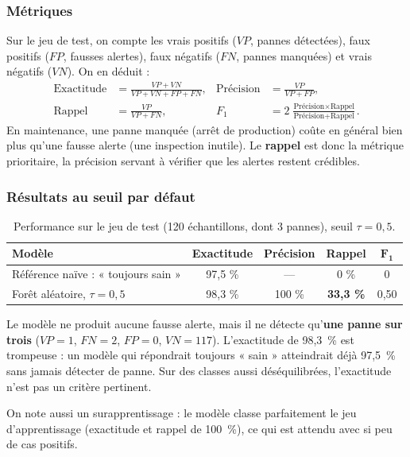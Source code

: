 \documentclass[11pt,a4paper]{article}
\newcommand{\pct}[1]{#1~\%}
\begin{document}
\subsubsection{Métriques}
Sur le jeu de test, on compte les vrais positifs ($VP$, pannes détectées), faux positifs ($FP$,
fausses alertes), faux négatifs ($FN$, pannes manquées) et vrais négatifs ($VN$). On en déduit :
\begin{align}
\text{Exactitude} &= \frac{VP + VN}{VP + VN + FP + FN}, &
\text{Précision} &= \frac{VP}{VP + FP}, \\[4pt]
\text{Rappel} &= \frac{VP}{VP + FN}, &
F_1 &= 2\,\frac{\text{Précision} \times \text{Rappel}}{\text{Précision} + \text{Rappel}} .
\end{align}
En maintenance, une panne manquée (arrêt de production) coûte en général bien plus qu'une fausse
alerte (une inspection inutile). Le \textbf{rappel} est donc la métrique prioritaire, la précision
servant à vérifier que les alertes restent crédibles.

\subsubsection{Résultats au seuil par défaut}
\begin{table}[ht]
\centering\small
\caption{Performance sur le jeu de test (120 échantillons, dont 3 pannes), seuil $\tau = 0{,}5$.}
\label{tab:metriques}
\begin{tabular}{@{}lcccc@{}}
\toprule
\textbf{Modèle} & \textbf{Exactitude} & \textbf{Précision} & \textbf{Rappel} & $\boldsymbol{F_1}$ \\
\midrule
Référence naïve : « toujours sain » & 97,5 \% & — & 0 \% & 0 \\
Forêt aléatoire, $\tau = 0{,}5$ & 98,3 \% & 100 \% & \textcolor{rouge}{\textbf{33,3 \%}} & 0,50 \\
\bottomrule
\end{tabular}
\end{table}

Le modèle ne produit aucune fausse alerte, mais il ne détecte qu'\textbf{une panne sur trois}
($VP=1$, $FN=2$, $FP=0$, $VN=117$). L'exactitude de \pct{98,3} est trompeuse : un modèle qui
répondrait toujours « sain » atteindrait déjà \pct{97,5} sans jamais détecter de panne. Sur des
classes aussi déséquilibrées, l'exactitude n'est pas un critère pertinent.

On note aussi un surapprentissage : le modèle classe parfaitement le jeu d'apprentissage
(exactitude et rappel de \pct{100}), ce qui est attendu avec si peu de cas positifs.
\end{document}

